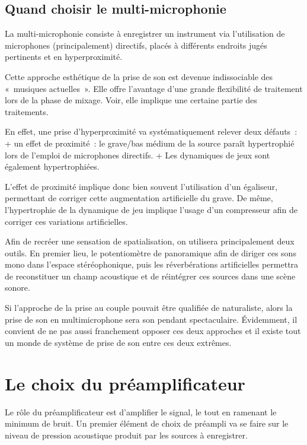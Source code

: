 \documentclass[
]{book}
\begin{document}
\hypertarget{quand-choisir-le-multi-microphonie}{%
\subsection{Quand choisir le multi-microphonie}\label{quand-choisir-le-multi-microphonie}}

La multi-microphonie consiste à enregistrer un instrument via l'utilisation de microphones (principalement) directifs, placés à différents endroits jugés pertinents et en hyperproximité.

Cette approche esthétique de la prise de son est devenue indissociable des «~musiques actuelles~». Elle offre l'avantage d'une grande flexibilité de traitement lors de la phase de mixage. Voir, elle implique une certaine partie des traitements.

En effet, une prise d'hyperproximité va systématiquement relever deux défauts~:
+ un effet de proximité~: le grave/bas médium de la source paraît hypertrophié lors de l'emploi de microphones directifs.
+ Les dynamiques de jeux sont également hypertrophiées.

L'effet de proximité implique donc bien souvent l'utilisation d'un égaliseur, permettant de corriger cette augmentation artificielle du grave. De même, l'hypertrophie de la dynamique de jeu implique l'usage d'un compresseur afin de corriger ces variations artificielles.

Afin de recréer une sensation de spatialisation, on utilisera principalement deux outils. En premier lieu, le potentiomètre de panoramique afin de diriger ces sons mono dans l'espace stéréophonique, puis les réverbérations artificielles permettra de reconstituer un champ acoustique et de réintégrer ces sources dans une scène sonore.

Si l'approche de la prise au couple pouvait être qualifiée de naturaliste, alors la prise de son en multimicrophone sera son pendant spectaculaire. Évidemment, il convient de ne pas aussi franchement opposer ces deux approches et il existe tout un monde de système de prise de son entre ces deux extrêmes.

\hypertarget{le-choix-du-pruxe9amplificateur}{%
\section{Le choix du préamplificateur}\label{le-choix-du-pruxe9amplificateur}}

Le rôle du préamplificateur est d'amplifier le signal, le tout en ramenant le minimum de bruit. Un premier élément de choix de préampli va se faire sur le niveau de pression acoustique produit par les sources à enregistrer.
\end{document}
